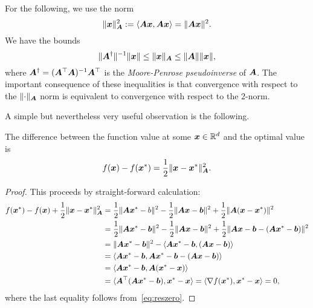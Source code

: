 For the following, we use the norm
\begin{equation*}
 \Vert {\bm{x}}\Vert_{\bm{A}}^2 := \langle {\bm{A}\bm{x}}, {\bm{A}\bm{x}} \rangle = \Vert {\bm{A}\bm{x}}\Vert^2.
\end{equation*}
We have the bounds
\begin{equation*}
 \Vert {\bm{A}^{\dagger}}\Vert^{-1} \Vert {\bm{x}}\Vert \leq \Vert {\bm{x}}\Vert_{\bm{A}} \leq \Vert {\bm{A}}\Vert \Vert {\bm{x}}\Vert,
\end{equation*}
where $\bm{A}^{\dagger}=(\bm{A}^{\top}\bm{A})^{-1}\bm{A}^{\top}$ is the {\em Moore-Penrose pseudoinverse} of $\bm{A}$. The important consequence of these inequalities is that convergence with respect to the $\Vert {\cdot}\Vert_{\bm{A}}$ norm is equivalent to convergence with respect to the $2$-norm.

A simple but nevertheless very useful observation is the following.
\begin{lemma}\label{le:anorm}
 The difference between the function value at some $\bm{x}\in \mathbb{R}^d$ and the optimal value is
 \begin{equation*}
  f(\bm{x})-f(\bm{x}^*) = \frac{1}{2}\Vert {\bm{x}-\bm{x}^*}\Vert_{\bm{A}}^2.
 \end{equation*}
\end{lemma}

\begin{proof}
 This proceeds by straight-forward calculation:
 \begin{align*}
  f(\bm{x}^*)-f(\bm{x})+\frac{1}{2}\Vert {\bm{x}-\bm{x}^*}\Vert_{\bm{A}}^2 &= \frac{1}{2}\Vert {\bm{A}\bm{x}^*-b}\Vert^2-\frac{1}{2}\Vert {\bm{A}\bm{x}-\bm{b}}\Vert^2+\frac{1}{2}\Vert {\bm{A}(\bm{x}-\bm{x}^*)}\Vert^2\\
  &= \frac{1}{2}\Vert {\bm{A}\bm{x}^*-\bm{b}}\Vert^2-\frac{1}{2}\Vert {\bm{A}\bm{x}-\bm{b}}\Vert^2+\frac{1}{2}\Vert {\bm{A}\bm{x}-\bm{b}-(\bm{A}\bm{x}^*-\bm{b})}\Vert^2\\
  &= \Vert {\bm{A}\bm{x}^*-\bm{b}}\Vert^2 - \langle {\bm{A}\bm{x}^*-\bm{b}}, {(\bm{A}\bm{x}-\bm{b})} \rangle\\
  &= \langle {\bm{A}\bm{x}^*-\bm{b}}, {\bm{A}\bm{x}^*-\bm{b}-(\bm{A}\bm{x}-\bm{b})} \rangle\\
  &= \langle {\bm{A}\bm{x}^*-\bm{b}}, {\bm{A}(\bm{x}^*-\bm{x})} \rangle\\
  &= \langle {\bm{A}^{\top}(\bm{A}\bm{x}^*-\bm{b})}, {\bm{x}^*-\bm{x}} \rangle = \langle {\nabla f(\bm{x}^*)}, {\bm{x}^*-\bm{x}} \rangle = 0,
 \end{align*}
 where the last equality follows from~\eqref{eq:reszero}.
\end{proof}


